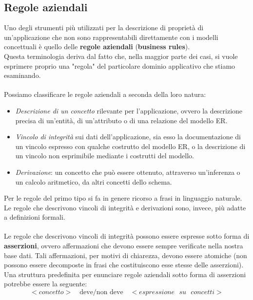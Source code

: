 \subsection{Regole aziendali}
Uno degli strumenti più utilizzati per la descrizione di proprietà di un'applicazione che non sono rappresentabili direttamente con i modelli concettuali è quello delle \textbf{regole aziendali} (\textbf{business rules}).\\
Questa terminologia deriva dal fatto che, nella maggior parte dei casi, si vuole esprimere proprio una "regola" del particolare dominio applicativo che stiamo esaminando.\\\\
Possiamo classificare le regole aziendali a seconda della loro natura:
    \begin{itemize}
        \item{\textit{Descrizione di un concetto} rilevante per l'applicazione, ovvero la descrizione precisa di un'entità, di un'attributo o di una relazione del modello ER.}
        \item{\textit{Vincolo di integrità} sui dati dell'applicazione, sia esso la documentazione di un vincolo espresso con qualche costrutto del modello ER, o la descrizione di un vincolo non esprimibile mediante i costrutti del modello.}
        \item{\textit{Derivazione}: un concetto che può essere ottenuto, attraverso un'inferenza o un calcolo aritmetico, da altri concetti dello schema.}
    \end{itemize}
Per le regole del primo tipo si fa in genere ricorso a frasi in linguaggio naturale.\\
Le regole che descrivono vincoli di integrità e derivazioni sono, invece, più adatte a definizioni formali.\\\\
Le regole che descrivono vincoli di integrità possono essere espresse sotto forma di \textbf{asserzioni}, ovvero affermazioni che devono essere sempre verificate nella nostra base dati. Tali affermazioni, per motivi di chiarezza, devono essere atomiche (non possono essere decomposte in frasi che costituiscono esse stesse delle asserzioni).\\
Una struttura predefinita per enunciare regole aziendali sotto forma di asserzioni potrebbe essere la seguente:
    \begin{equation}
        <concetto> \quad \text{deve/non deve} \quad <espressione \text{ } su \text{ } concetti>
    \end{equation}
